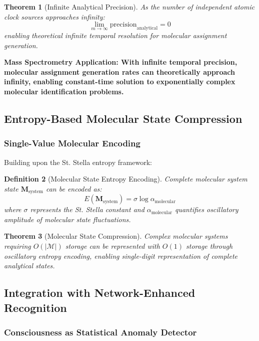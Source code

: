 \documentclass[11pt,a4paper]{article}
\newtheorem{theorem}{Theorem}[section]
\newtheorem{definition}[theorem]{Definition}
\theoremstyle{remark}
\begin{document}
\begin{theorem}[Infinite Analytical Precision]
As the number of independent atomic clock sources approaches infinity:
$$\lim_{m \to \infty} \text{precision}_{\text{analytical}} = 0$$
enabling theoretical infinite temporal resolution for molecular assignment generation.
\end{theorem}

\textbf{Mass Spectrometry Application: With infinite temporal precision, molecular assignment generation rates can theoretically approach infinity, enabling constant-time solution to exponentially complex molecular identification problems.}

\subsection{Entropy-Based Molecular State Compression}

\subsubsection{Single-Value Molecular Encoding}

Building upon the St. Stella entropy framework:

\begin{definition}[Molecular State Entropy Encoding]
Complete molecular system state $\mathbf{M}_{\text{system}}$ can be encoded as:
$$E(\mathbf{M}_{\text{system}}) = \sigma \log \alpha_{\text{molecular}}$$
where $\sigma$ represents the St. Stella constant and $\alpha_{\text{molecular}}$ quantifies oscillatory amplitude of molecular state fluctuations.
\end{definition}

\begin{theorem}[Molecular State Compression]
Complex molecular systems requiring $O(|\mathcal{M}|)$ storage can be represented with $O(1)$ storage through oscillatory entropy encoding, enabling single-digit representation of complete analytical states.
\end{theorem}

\subsection{Integration with Network-Enhanced Recognition}

\subsubsection{Consciousness as Statistical Anomaly Detector}
\end{document}
